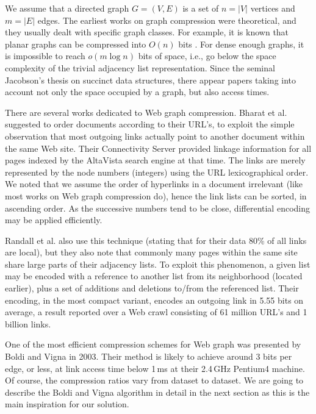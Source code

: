 \documentclass[envcountsame]{llncs}
\begin{document}
We assume that a directed graph $G = (V, E)$ is a set of $n = |V|$ vertices and 
$m = |E|$ edges.
The earliest works on graph compression were theoretical, and they usually dealt 
with specific graph classes.  For example, it is known that planar graphs can be 
compressed into $O(n)$ bits \cite{Turan84,DBLP:journals/siamcomp/HeKL00}.  
For dense enough graphs, it is impossible to reach $o(m \log n)$ bits of space, 
i.e., go below the space complexity of the trivial adjacency list representation.
Since the seminal Jacobson's thesis \cite{Jac89} on succinct data 
structures, there appear papers taking into account not only the space occupied 
by a graph, but also access times.

There are several works dedicated to Web graph compression.  Bharat et al. 
\cite{DBLP:journals/cn/BharatBHKV98}
suggested to order documents according to their URL's, to exploit the simple 
observation that most outgoing links actually point to another document within 
the same Web site.  Their Connectivity Server provided linkage information 
for all pages indexed by the AltaVista search engine at that time.
The links are merely represented by the node numbers (integers) using the URL 
lexicographical order.  We noted that we assume the order of hyperlinks in a 
document irrelevant (like most works on Web graph compression do), hence 
the link lists can be sorted, in ascending order.
As the successive numbers tend to be close, differential encoding may be applied 
efficiently.

Randall et al. \cite{randall01link} also use this technique (stating that for 
their data 80\% of all links are local), but they also note that commonly many 
pages within the same site share large parts of their adjacency lists.  
To exploit this phenomenon, a given list may be encoded with a reference to another 
list from its neighborhood (located earlier), plus a set of additions and deletions 
to/from the referenced list.
Their encoding, in the most compact variant, encodes an outgoing link in 5.55 bits 
on average, a result reported over a Web crawl consisting of 61 million URL's and 
1 billion links.

One of the most efficient compression schemes for Web graph was presented by
Boldi and Vigna \cite{DBLP:conf/www/BoldiV04} in 2003. Their method is likely to 
achieve around 3 bits per edge, or less, at link access time below 1\,ms at their 
2.4\,GHz Pentium4 machine.  Of course, the compression ratios vary from dataset 
to dataset. We are going to describe the Boldi and Vigna algorithm in detail in 
the next section as this is the main inspiration for our solution.
\end{document}
